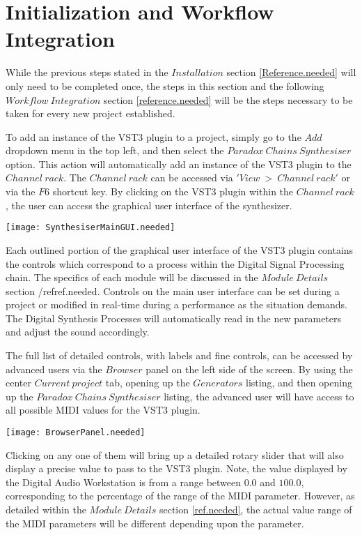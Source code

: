 \documentclass[a4paper,12pt]{report}
\begin{document}
\section{Initialization and Workflow Integration}
While the previous steps stated in the $Installation$ section \ref{Reference.needed} will only need to be completed once, the steps in this section and the following $Workflow\ Integration$ section \ref{reference.needed} will be the steps necessary to be taken for every new project established.

To add an instance of the VST3 plugin to a project, simply go to the $Add$ dropdown menu in the top left, and then select the $Paradox\ Chains\ Synthesiser$ option. This action will automatically add an instance of the VST3 plugin to the $Channel\ rack$. The $Channel\ rack$ can be accessed via $'View\ >\ Channel\ rack'$ or via the $F6$ shortcut key. By clicking on the VST3 plugin within the $Channel\ rack$, the user can access the graphical user interface of the synthesizer.

\texttt{[image: SynthesiserMainGUI.needed]}

Each outlined portion of the graphical user interface of the VST3 plugin contains the controls which correspond to a process within the Digital Signal Processing chain. The specifics of each module will be discussed in the $Module\ Details$ section /ref{ref.needed}. Controls on the main user interface can be set during a project or modified in real-time during a performance as the situation demands. The Digital Synthesis Processes will automatically read in the new parameters and adjust the sound accordingly.

The full list of detailed controls, with labels and fine controls, can be accessed by advanced users via the $Browser$ panel on the left side of the screen. By using the center $Current\ project$ tab, opening up the $Generators$ listing, and then opening up the $Paradox\ Chains\ Synthesiser$ listing, the advanced user will have access to all possible MIDI values for the VST3 plugin.

\texttt{[image: BrowserPanel.needed]}

Clicking on any one of them will bring up a detailed rotary slider that will also display a precise value to pass to the VST3 plugin. Note, the value displayed by the Digital Audio Workstation is from a range between $0.0$ and $100.0$, corresponding to the percentage of the range of the MIDI parameter. However, as detailed within the $Module\ Details$ section \ref{ref.needed}, the actual value range of the MIDI parameters will be different depending upon the parameter.
\end{document}
